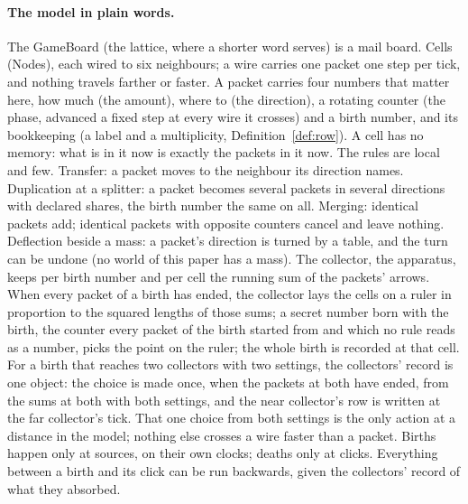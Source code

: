 \documentclass[11pt]{article}
\theoremstyle{definition}
\begin{document}
\paragraph{The model in plain words.} The GameBoard (the lattice, where a
shorter word serves) is a mail board.
Cells (Nodes), each wired to six neighbours; a wire carries one packet one
step per tick, and nothing travels farther or faster. A packet carries
four numbers that matter here, how much (the amount), where to (the
direction), a rotating counter (the phase, advanced a fixed step at every
wire it crosses) and a birth number, and its bookkeeping (a label and a
multiplicity, Definition~\ref{def:row}). A cell has no memory: what is in it now is exactly the
packets in it now. The rules are local and few. Transfer: a packet moves
to the neighbour its direction names. Duplication at a splitter: a packet
becomes several packets in several directions with declared shares, the
birth number the same on all. Merging: identical packets add; identical
packets with opposite counters cancel and leave nothing. Deflection
beside a mass: a packet's direction is turned by a table, and the turn
can be undone (no world of this paper has a mass). The collector, the
apparatus, keeps per birth number and per cell the running sum of the
packets' arrows. When every packet of a birth has ended, the collector
lays the cells on a ruler in proportion to the squared lengths of those
sums; a secret number born with the birth, the counter every packet of
the birth started from and which no rule reads as a number, picks the
point on the ruler; the whole birth is recorded at that cell. For a birth
that reaches two collectors with two settings, the collectors' record is
one object: the choice is made once, when the packets at both have
ended, from the sums at both with both settings, and the near
collector's row is written at the far collector's tick. That one choice
from both settings is the only action at a distance in the model;
nothing else crosses a wire faster than a packet. Births happen only at
sources, on their own clocks; deaths only at clicks. Everything between
a birth and its click can be run backwards, given the collectors' record
of what they absorbed.
\end{document}
